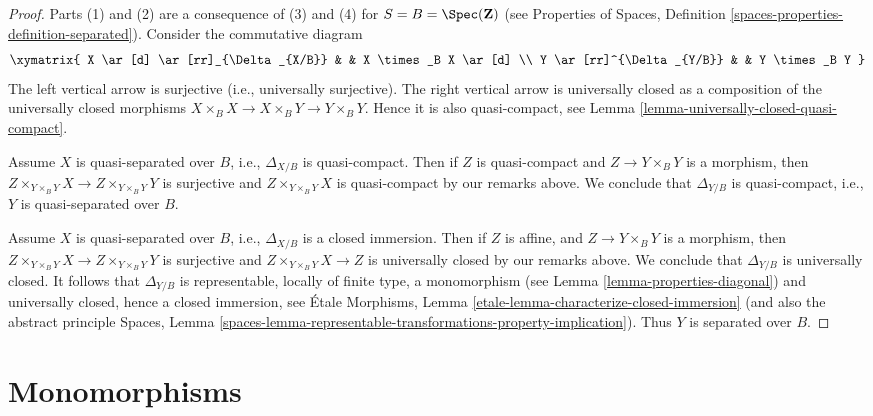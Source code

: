 \begin{proof}
Parts (1) and (2) are a consequence of (3) and (4) for
$S = B = \Spec(\mathbf{Z})$ (see
Properties of Spaces,
Definition \ref{spaces-properties-definition-separated}).
Consider the commutative diagram
$$
\xymatrix{
X \ar[d] \ar[rr]_{\Delta_{X/B}} & & X \times_B X \ar[d] \\
Y \ar[rr]^{\Delta_{Y/B}} & & Y \times_B Y
}
$$
The left vertical arrow is surjective (i.e., universally surjective).
The right vertical arrow is universally closed as a composition
of the universally closed morphisms
$X \times_B X \to X \times_B Y \to Y \times_B Y$. Hence it is also
quasi-compact, see
Lemma \ref{lemma-universally-closed-quasi-compact}.

\medskip\noindent
Assume $X$ is quasi-separated over $B$, i.e.,  $\Delta_{X/B}$ is
quasi-compact. Then if $Z$ is quasi-compact and $Z \to Y \times_B Y$ is
a morphism, then $Z \times_{Y \times_B Y} X \to Z \times_{Y \times_B Y} Y$
is surjective and $Z \times_{Y \times_B Y} X$ is quasi-compact by our remarks
above. We conclude that $\Delta_{Y/B}$ is quasi-compact, i.e., $Y$
is quasi-separated over $B$.

\medskip\noindent
Assume $X$ is quasi-separated over $B$, i.e.,  $\Delta_{X/B}$ is a closed
immersion. Then if $Z$ is affine, and $Z \to Y \times_B Y$ is
a morphism, then $Z \times_{Y \times_B Y} X \to Z \times_{Y \times_B Y} Y$
is surjective and $Z \times_{Y \times_B Y} X \to Z$ is universally closed
by our remarks above. We conclude that $\Delta_{Y/B}$ is universally closed.
It follows that $\Delta_{Y/B}$ is representable, locally of finite type, a
monomorphism (see
Lemma \ref{lemma-properties-diagonal})
and universally closed, hence a closed immersion, see
\'Etale Morphisms,
Lemma \ref{etale-lemma-characterize-closed-immersion}
(and also the abstract principle
Spaces, Lemma
\ref{spaces-lemma-representable-transformations-property-implication}).
Thus $Y$ is separated over $B$.
\end{proof}













\section{Monomorphisms}
\label{section-monomorphisms}

